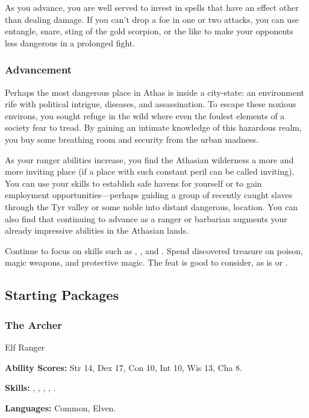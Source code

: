 As you advance, you are well served to invest in spells that have an effect other than dealing damage. If you can't drop a foe in one or two attacks, you can use entangle, snare, sting of the gold scorpion, or the like to make your opponents less dangerous in a prolonged fight.

\subsubsection{Advancement}

Perhaps the most dangerous place in Athas is inside a city-state: an environment rife with political intrigue, diseases, and assassination. To escape these noxious environs, you sought refuge in the wild where even the foulest elements of a society fear to tread. By gaining an intimate knowledge of this hazardous realm, you buy some breathing room and security from the urban madness.

As your ranger abilities increase, you find the Athasian wilderness a more and more inviting place (if a place with such constant peril can be called inviting). You can use your skills to establish safe havens for yourself or to gain employment opportunities---perhaps guiding a group of recently caught slaves through the Tyr valley or some noble into distant dangerous, location. You can also find that continuing to advance as a ranger or barbarian augments your already impressive abilities in the Athasian lands.

Continue to focus on skills such as , , and . Spend discovered treasure on poison, magic weapons, and protective magic. The  feat is good to consider, as is  or .

\subsection{Starting Packages}
\subsubsection{The Archer}
Elf Ranger

\textbf{Ability Scores:} Str 14, Dex 17, Con 10, Int 10, Wis 13, Cha 8.

\textbf{Skills:} , , , , .

\textbf{Languages:} Common, Elven.


